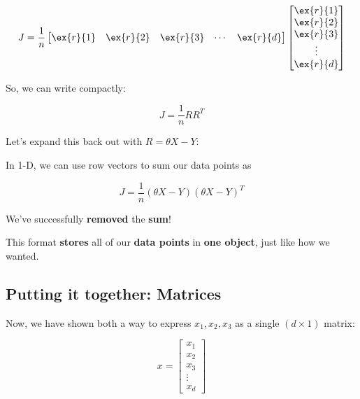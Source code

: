         \begin{equation}
            J = 
            \frac{1}{n}
            \begin{bmatrix}
              \ex{r}{1} & \ex{r}{2} & \ex{r}{3} & \cdots & \ex{r}{d}
            \end{bmatrix}
            \begin{bmatrix}
              \ex{r}{1} \\ \ex{r}{2} \\ \ex{r}{3} \\ \vdots \\ \ex{r}{d}
            \end{bmatrix}
        \end{equation}
        
        So, we can write compactly:
        
        \begin{equation}
            J = \frac{1}{n} RR^T
        \end{equation}
        
        Let's expand this back out with $R = \theta X - Y$:\\
        
        \begin{concept}
            In 1-D, we can use row vectors to sum our data points as
            
            \begin{equation*}
                J = \frac{1}{n} (\theta X - Y)(\theta X - Y)^T
            \end{equation*}
        \end{concept}
        
        We've successfully \textbf{removed} the \textbf{sum}!
        
        This format \textbf{stores} all of our \textbf{data points} in \textbf{one object}, just like how we wanted.
        
    \subsection{Putting it together: Matrices}
    
        Now, we have shown both a way to express $x_1, x_2, x_3$ as a single $(d \times 1)$ matrix:
        
        \begin{equation}
            x = 
            \begin{bmatrix}
              x_1 \\ x_2 \\ x_3 \\ \vdots \\ x_d
            \end{bmatrix}
        \end{equation}
        
